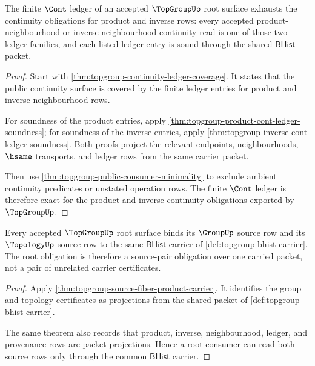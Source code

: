 \begin{theorem}
\label{thm:topgroup-ledger-exactness-obligation}
The finite $\Cont$ ledger of an accepted $\TopGroupUp$ root surface exhausts the
continuity obligations for product and inverse rows: every accepted
product-neighbourhood or inverse-neighbourhood continuity read is one of those
two ledger families, and each listed ledger entry is sound through the shared
$\mathsf{BHist}$ packet.
\end{theorem}
\begin{proof}
Start with \autoref{thm:topgroup-continuity-ledger-coverage}. It states that
the public continuity surface is covered by the finite ledger entries for
product and inverse neighbourhood rows.

For soundness of the product entries, apply
\autoref{thm:topgroup-product-cont-ledger-soundness}; for soundness of the
inverse entries, apply \autoref{thm:topgroup-inverse-cont-ledger-soundness}.
Both proofs project the relevant endpoints, neighbourhoods, $\hsame$ transports,
and ledger rows from the same carrier packet.

Then use \autoref{thm:topgroup-public-consumer-minimality} to exclude ambient
continuity predicates or unstated operation rows. The finite $\Cont$ ledger is
therefore exact for the product and inverse continuity obligations exported by
$\TopGroupUp$.
\end{proof}

\begin{theorem}
\label{thm:topgroup-source-pair-carrier-obligation}
Every accepted $\TopGroupUp$ root surface binds its $\GroupUp$ source row and
its $\TopologyUp$ source row to the same $\mathsf{BHist}$ carrier of
\autoref{def:topgroup-bhist-carrier}. The root obligation is therefore a
source-pair obligation over one carried packet, not a pair of unrelated carrier
certificates.
\end{theorem}
\begin{proof}
Apply \autoref{thm:topgroup-source-fiber-product-carrier}. It identifies the
group and topology certificates as projections from the shared packet of
\autoref{def:topgroup-bhist-carrier}.

The same theorem also records that product, inverse, neighbourhood, ledger, and
provenance rows are packet projections. Hence a root consumer can read both
source rows only through the common $\mathsf{BHist}$ carrier.
\end{proof}

